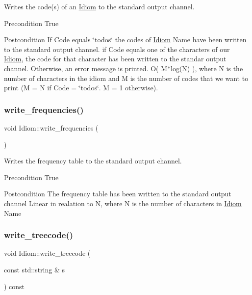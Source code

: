 Writes the code(s) of an \hyperlink{classIdiom}{Idiom} to the standard output channel. 

\begin{DoxyPrecond}{Precondition}
True 
\end{DoxyPrecond}
\begin{DoxyPostcond}{Postcondition}
If Code equals \char`\"{}todos\char`\"{} the codes of \hyperlink{classIdiom}{Idiom} Name have been written to the standard output channel. if Code equals one of the characters of our \hyperlink{classIdiom}{Idiom}, the code for that character has been written to the standar output channel. Otherwise, an error message is printed.  O( M$\ast$log(\+N) ), where N is the number of characters in the idiom and M is the number of codes that we want to print (M = N if Code = \char`\"{}todos\char`\"{}. M = 1 otherwise). 
\end{DoxyPostcond}
\mbox{\label{classIdiom_ae596199341218054d763850ff4ecb316}} 
\subsubsection{\texorpdfstring{write\+\_\+frequencies()}{write\_frequencies()}}
{\footnotesize\ttfamily void Idiom\+::write\+\_\+frequencies (\begin{DoxyParamCaption}{ }\end{DoxyParamCaption})}



Writes the frequency table to the standard output channel. 

\begin{DoxyPrecond}{Precondition}
True 
\end{DoxyPrecond}
\begin{DoxyPostcond}{Postcondition}
The frequency table has been written to the standard output channel  Linear in realation to N, where N is the number of characters in \hyperlink{classIdiom}{Idiom} Name 
\end{DoxyPostcond}
\mbox{\label{classIdiom_ae860afb3dcb10d69e3d1ac9a5c25508b}} 
\subsubsection{\texorpdfstring{write\+\_\+treecode()}{write\_treecode()}}
{\footnotesize\ttfamily void Idiom\+::write\+\_\+treecode (\begin{DoxyParamCaption}\item[{const std\+::string \&}]{s }\end{DoxyParamCaption}) const}



